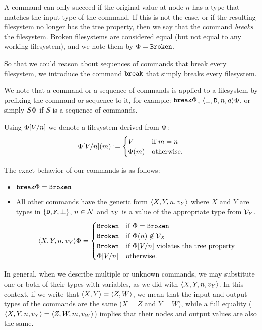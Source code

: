 \medskip

A command can only succeed if the original value at node $n$ has a type that matches
the input type of the command. If this is not the case, or if the resulting
filesystem no longer has the tree property, then we say that the command
{\em breaks} the filesystem. Broken filesystems are considered equal
(but not equal to any working filesystem), and we note them by $\Phi=\mathtt{Broken}$.

So that we could reason about sequences of commands that break every filesystem, 
we introduce the command $\mathtt{break}$ that simply breaks every filesystem.

We note that a command or a sequence of commands is applied to a filesystem
by prefixing the command or sequence to it, for example: $\mathtt{break}\Phi$, $\langle{\bot,\mathtt{D},n,d}\rangle\Phi$, 
or simply $S\Phi$ if $S$ is a sequence of commands.

\begin{mydef}
Using $\Phi[V/n]$ we denote a filesystem derived from $\Phi$:
\[ \Phi[V/n](m) :=
   \begin{cases}
   V &\mbox{if~} m=n\\
   \Phi(m) &\mbox{otherwise.}
   \end{cases}
\]
\end{mydef}

The exact behavior of our commands is as follows:
\begin{itemize}
\item $\mathtt{break}\Phi = \mathtt{Broken}$
\item
All other commands have the generic form $\langle{X,Y,n,v_Y}\rangle$ where
$X$ and $Y$ are types in $\{\mathtt{D},\mathtt{F},\bot\}$,
$n\in\mathcal{N}$ and $v_Y$ is a value of the appropriate type from $\mathcal{V}_{Y}$.
\[ \langle{X,Y,n,v_Y}\rangle\Phi = 
   \begin{cases}
   \mathtt{Broken} &\mbox{if~} \Phi=\mathtt{Broken}\\
   \mathtt{Broken} &\mbox{if~} \Phi(n)\not\in\mathcal{V}_{X}\\
   \mathtt{Broken} &\mbox{if~} \Phi[V/n] \mbox{~violates the tree property}\\
   \Phi[V/n] &\mbox{otherwise.}
   \end{cases}
\]
\end{itemize}


In general, when we describe multiple or unknown commands, we may substitute one or both
of their types with variables, as we did with $\langle{X,Y,n,v_Y}\rangle$. In this context,
if we write that $\langle{X,Y}\rangle=\langle{Z,W}\rangle$, we mean that the input and output types
of the commands are the same ($X=Z$ and $Y=W$), while a full equality 
($\langle{X,Y,n,v_Y}\rangle=\langle{Z,W,m,v_W}\rangle$)
implies
that their nodes and output values are also the same.

